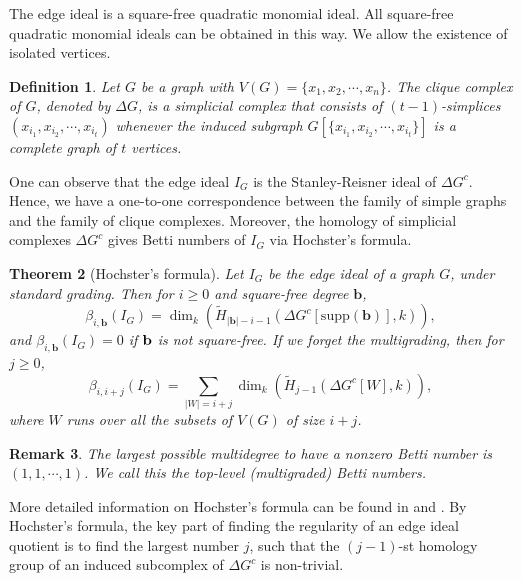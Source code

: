 \documentclass[dvipsnames,10pt]{article}
\newtheorem{theorem}{Theorem}[section]
\newtheorem{defi}[theorem]{Definition}
\newtheorem{remark}[theorem]{Remark}
\begin{document}
The edge ideal is a square-free quadratic monomial ideal. All square-free quadratic monomial ideals can be obtained in this way. We allow the existence of isolated vertices.

\begin{defi}
    Let $G$ be a graph with $V(G)=\{x_1,x_2,\cdots,x_n\}$. The clique complex of $G$, denoted by $\Delta G$, is a simplicial complex that consists of $(t-1)$-simplices $(x_{i_1},x_{i_2},\cdots ,x_{i_t})$ whenever the induced subgraph $G[\{x_{i_1},x_{i_2},\cdots ,x_{i_t}\}]$ is a complete graph of $t$ vertices.
\end{defi}

One can observe that the edge ideal $I_G$ is the Stanley-Reisner ideal of $\Delta G^c$. Hence, we have a one-to-one correspondence between the family of simple graphs and the family of clique complexes. Moreover, the homology of simplicial complexes $\Delta G^c$ gives Betti numbers of $I_G$ via Hochster's formula.

\begin{theorem}[Hochster's formula]
    Let $I_G$ be the edge ideal of a graph $G$, under standard grading. Then for $i\geq 0$ and square-free degree $\mathbf{b}$,
    \begin{equation*}
        \beta_{i,\mathbf{b}}(I_G)=\dim_k(\widetilde{H}_{|\mathbf{b}|-i-1}\left(\Delta G^c[\mathrm{supp}(\mathbf{b})], k\right)),
    \end{equation*}
    and $\beta_{i,\mathbf{b}}(I_G)=0$ if $\bf{b}$ is not square-free. If we forget the multigrading, then for $j\geq0$,
    \begin{equation*}
        \beta_{i,i+j}(I_G)=\sum_{|W|=i+j}\dim_k(\widetilde{H}_{j-1}\left(\Delta G^c[W], k\right)),
    \end{equation*}
    where $W$ runs over all the subsets of $V(G)$ of size $i+j$.
\end{theorem}

\begin{remark}
    The largest possible multidegree to have a nonzero Betti number is $(1,1,\cdots,1)$. We call this the \emph{top-level (multigraded) Betti numbers}.
\end{remark}
More detailed information on Hochster's formula can be found in \cite{francisco2014survey} and \cite{stanley1996combinatorics}. By Hochster's formula, the key part of finding the regularity of an edge ideal quotient is to find the largest number $j$, such that the $(j-1)$-st homology group of an induced subcomplex of $\Delta G^c$ is non-trivial.
\end{document}
